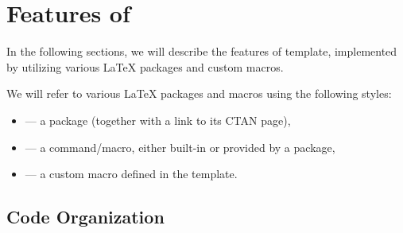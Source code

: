 \chapter{Features of \TeXtured{}} \label{ch:Features}

In the following sections, we will describe the features of \TeXtured{} template, implemented by utilizing various \LaTeX{} packages and custom macros.

\begin{remark}
    We will refer to various \LaTeX{} packages and macros using the following styles:
    \begin{itemize}
        \item {} --- a package (together with a link to its \textsf{CTAN} page),
        \item \macro{\macro} --- a command/macro, either built-in or provided by a package,
        \item \custommacro{\custommacro} --- a custom macro defined in the \TeXtured{} template. \qedhere*
    \end{itemize}
\end{remark}

\section{Code Organization}%
\label{sec:Code Organization}

